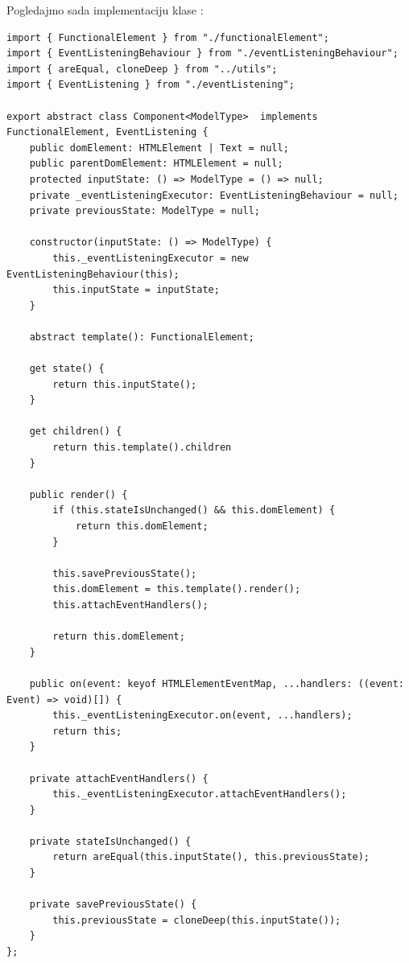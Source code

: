 \documentclass[12pt,oneside]{memoir}
\newcommand{\code}[1]{\allowbreak{\colorbox{codegray}{\texttt{\scalebox{0.9}{#1}}}}}%
\begin{document}
\noindent
Pogledajmo sada implementaciju klase \code{Component<T>}:
\begin{lstlisting}[style=jsStyle, escapeinside=\#\#, caption={Fajl \code{core/component.ts}},label=file:core:component.ts]
import { FunctionalElement } from "./functionalElement";
import { EventListeningBehaviour } from "./eventListeningBehaviour";
import { areEqual, cloneDeep } from "../utils";
import { EventListening } from "./eventListening";

export abstract class Component<ModelType>  implements FunctionalElement, EventListening {
    public domElement: HTMLElement | Text = null;
    public parentDomElement: HTMLElement = null;
    protected inputState: () => ModelType = () => null;
    private _eventListeningExecutor: EventListeningBehaviour = null;
    private previousState: ModelType = null;

    constructor(inputState: () => ModelType) {
        this._eventListeningExecutor = new EventListeningBehaviour(this);
        this.inputState = inputState;
    }

    abstract template(): FunctionalElement;

    get state() {
        return this.inputState();
    }

    get children() {
        return this.template().children
    }

    public render() {
        if (this.stateIsUnchanged() && this.domElement) {
            return this.domElement;
        }

        this.savePreviousState();
        this.domElement = this.template().render();
        this.attachEventHandlers();

        return this.domElement;
    }

    public on(event: keyof HTMLElementEventMap, ...handlers: ((event: Event) => void)[]) {
        this._eventListeningExecutor.on(event, ...handlers);
        return this;
    }

    private attachEventHandlers() {
        this._eventListeningExecutor.attachEventHandlers();
    }
    
    private stateIsUnchanged() {
        return areEqual(this.inputState(), this.previousState);
    }

    private savePreviousState() {
        this.previousState = cloneDeep(this.inputState());
    }
};

\end{lstlisting}
\end{document}
